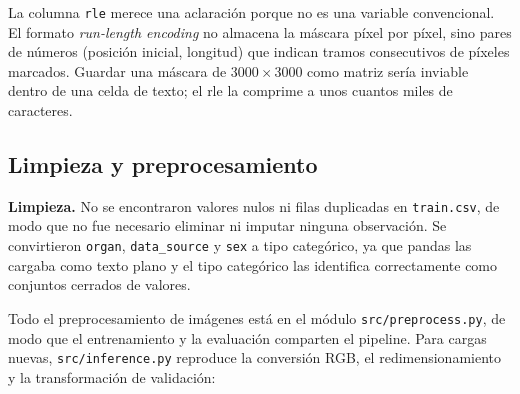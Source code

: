 \documentclass[11pt,letterpaper]{article}
\begin{document}
La columna \texttt{rle} merece una aclaración porque no es una variable convencional. El formato
\emph{run-length encoding} no almacena la máscara píxel por píxel, sino pares de números
(posición inicial, longitud) que indican tramos consecutivos de píxeles marcados. Guardar una
máscara de $3000 \times 3000$ como matriz sería inviable dentro de una celda de texto; el rle la
comprime a unos cuantos miles de caracteres.

\subsection{Limpieza y preprocesamiento}

\textbf{Limpieza.} No se encontraron valores nulos ni filas duplicadas en \texttt{train.csv}, de modo
que no fue necesario eliminar ni imputar ninguna observación. Se convirtieron \texttt{organ},
\texttt{data\_source} y \texttt{sex} a tipo categórico, ya que pandas las cargaba como texto plano y
el tipo categórico las identifica correctamente como conjuntos cerrados de valores.

Todo el preprocesamiento de imágenes está en el módulo \texttt{src/preprocess.py}, de modo que el
entrenamiento y la evaluación comparten el pipeline. Para cargas nuevas, \texttt{src/inference.py}
reproduce la conversión RGB, el redimensionamiento y la transformación de validación:
\end{document}
